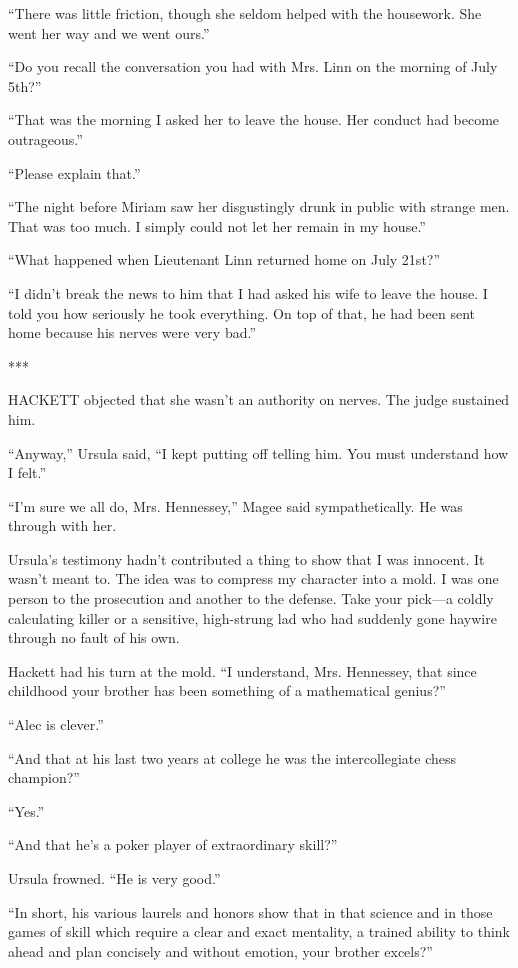 \documentclass{novel}
\begin{document}
{“There was little friction, though she seldom helped with the housework. She went her way and we went ours.”

“Do you recall the conversation you had with Mrs. Linn on the morning of July 5th?”

“That was the morning I asked her to leave the house. Her conduct had become outrageous.”

“Please explain that.”

“The night before Miriam saw her disgustingly drunk in public with strange men. That was too much. I simply could not let her remain in my house.”

“What happened when Lieutenant Linn returned home on July 21st?”

“I didn’t break the news to him that I had asked his wife to leave the house. I told you how seriously he took everything. On top of that, he had been sent home because his nerves were very bad.”

***

HACKETT objected that she wasn’t an authority on nerves. The judge sustained him.

“Anyway,” Ursula said, “I kept putting off telling him. You must understand how I felt.”

“I’m sure we all do, Mrs. Hennessey,” Magee said sympathetically. He was through with her.

Ursula’s testimony hadn’t contributed a thing to show that I was innocent. It wasn’t meant to. The idea was to compress my character into a mold. I was one person to the prosecution and another to the defense. Take your pick—a coldly calculating killer or a sensitive, high-strung lad who had suddenly gone haywire through no fault of his own.

Hackett had his turn at the mold. “I understand, Mrs. Hennessey, that since childhood your brother has been something of a mathematical genius?”

“Alec is clever.”

“And that at his last two years at college he was the intercollegiate chess champion?”

“Yes.”

“And that he’s a poker player of extraordinary skill?”

Ursula frowned. “He is very good.”

“In short, his various laurels and honors show that in that science and in those games of skill which require a clear and exact mentality, a trained ability to think ahead and plan concisely and without emotion, your brother excels?”

}
\end{document}
